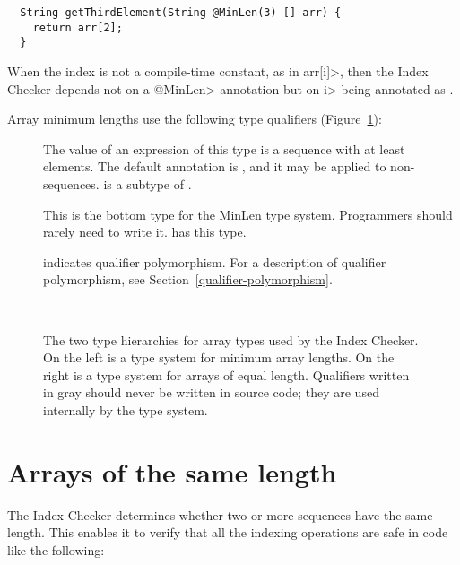 \begin{Verbatim}
  String getThirdElement(String @MinLen(3) [] arr) {
    return arr[2];
  }
\end{Verbatim}

When the index is not a compile-time constant, as in \<arr[i]>, then the
Index Checker depends not on a \<@MinLen> annotation but on \<i> being
annotated as
.

Array minimum lengths use the following type qualifiers
(Figure~\ref{fig-index-array-types}):

\begin{description}
\item[]
  The value of an expression of this type is a sequence with at least
   elements.  The default annotation is
  , and it may be applied to non-sequences.
   is a subtype of .
\item[]
  This is the bottom type for the MinLen type system.
  Programmers should rarely need to write it.
   has this type.
\item[]
  indicates qualifier polymorphism.
  For a description of qualifier polymorphism, see
  Section~\ref{qualifier-polymorphism}.
\end{description}

\begin{figure}
\begin{center}
  \hfill
  ~~~~\hfill~~~~
  \hfill
\end{center}
  \caption{The two type hierarchies for array types used by the Index
    Checker.  On the left is a type system for minimum array lengths.  On
    the right is a type system for arrays of equal length.  Qualifiers
    written in gray should never be written in source code; they are used
    internally by the type system.}
  \label{fig-index-array-types}
\end{figure}

\section{Arrays of the same length\label{index-samelen}}

The Index Checker determines whether two or more sequences have the same length.
This enables it to verify that all the indexing operations are safe in code
like the following:

